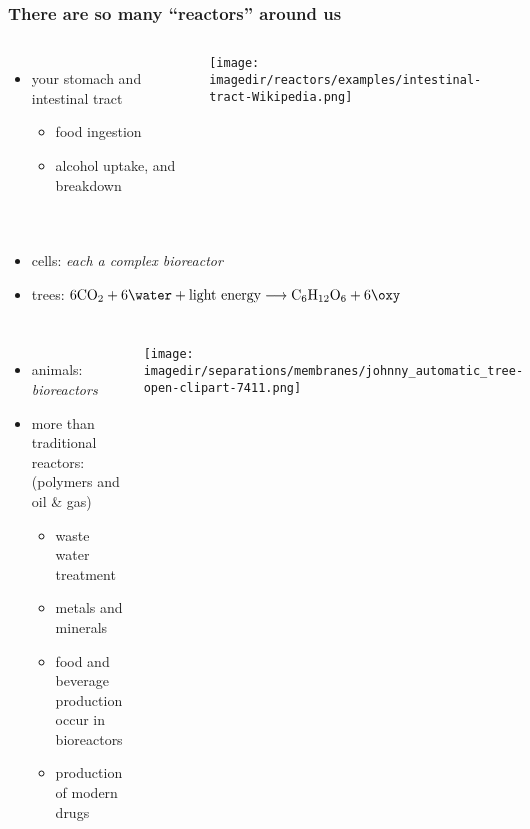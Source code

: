 \begin{frame}\frametitle{There are so many ``reactors'' around us}
	\begin{columns}[t]
			\begin{itemize}
				\item	your stomach and intestinal tract
				\begin{itemize}
					\item	food ingestion
					\item	alcohol uptake, and breakdown
				\end{itemize}
			\end{itemize}
			\vspace{-1.5cm}
			\begin{center}
				\texttt{[image: \\imagedir/reactors/examples/intestinal-tract-Wikipedia.png]}		
			\end{center}
	\end{columns}
	\begin{columns}[t]
			\begin{itemize}
				\item	cells: \emph{each a complex bioreactor}
				\item	trees: $6\text{CO}_2 + 6\water+ \text{light energy} \longrightarrow \text{C}_6\text{H}_{12}\text{O}_6 + 6\oxy$
			\end{itemize}
	\end{columns}
	\begin{columns}[t]
			\begin{itemize}
				\item	animals: \emph{bioreactors}
				\item	more than traditional reactors: (polymers and oil \& gas)
				\begin{itemize}
					\item	waste water treatment
					\item	metals and minerals
					\item	food and beverage production occur in bioreactors
					\item	production of modern drugs
				\end{itemize}
			\end{itemize}
			\vspace{-0.3cm}
			\begin{center}
				\texttt{[image: \\imagedir/separations/membranes/johnny\_automatic\_tree-open-clipart-7411.png]}
			\end{center}
	\end{columns}
\end{frame}

